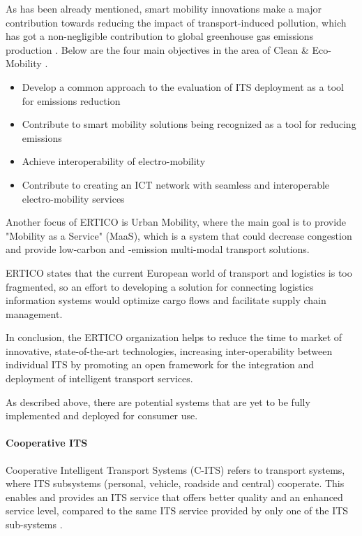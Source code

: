 \documentclass[0main.tex]{subfiles}
\begin{document}
As has been already mentioned, smart mobility innovations make a major contribution towards 
reducing the impact of transport-induced pollution, which has got a non-negligible contribution to 
global greenhouse gas emissions production \cite{Ritchie2020}. Below are the four main
objectives in the area of Clean \& Eco-Mobility \cite{ertico}.

\begin{itemize}
    \setlength\itemsep{-10pt}
    \item Develop a common approach to the evaluation of ITS deployment as a tool for emissions reduction
    \item Contribute to smart mobility solutions being recognized as a tool for reducing emissions
    \item Achieve interoperability of electro-mobility
    \item Contribute to creating an ICT network with seamless and interoperable electro-mobility services
\end{itemize}

Another focus of ERTICO is Urban Mobility, where the main goal is to provide "Mobility as a Service" (MaaS), 
which is a system that could decrease congestion and provide low-carbon and -emission multi-modal transport 
solutions.  

ERTICO states that the current European world of transport and logistics is too fragmented, so an effort to 
developing a solution for connecting logistics information systems would optimize cargo flows and facilitate supply 
chain management. 

In conclusion, the ERTICO organization helps to reduce the time to market of innovative,
state-of-the-art technologies, increasing inter-operability between individual ITS by promoting
an open framework for the integration and deployment of intelligent transport services. 

As described above, there are potential systems that are yet to be fully implemented and
deployed for consumer use. 

\paragraph{Cooperative ITS}

Cooperative Intelligent Transport Systems (C-ITS) refers to transport systems, where ITS 
subsystems (personal, vehicle, roadside and central) cooperate. This
enables and provides an ITS service that offers better quality and an enhanced service level,
compared to the same ITS service provided by only one of the ITS sub-systems \cite{2022}.
\end{document}
